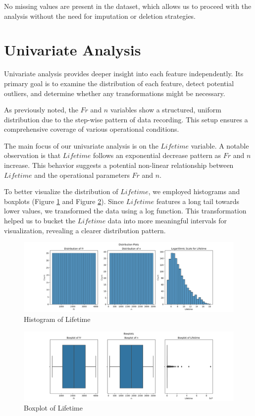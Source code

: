 No missing values are present in the dataset, which allows us to proceed with the analysis without the need for imputation or deletion strategies.


\section{Univariate Analysis}

Univariate analysis provides deeper insight into each feature independently. Its primary goal is to examine the distribution of each feature, detect potential outliers, and determine whether any transformations might be necessary.

As previously noted, the $Fr$ and $n$ variables show a structured, uniform distribution due to the step-wise pattern of data recording. This setup ensures a comprehensive coverage of various operational conditions.

The main focus of our univariate analysis is on the $Lifetime$ variable. A notable observation is that $Lifetime$ follows an exponential decrease pattern as $Fr$ and $n$ increase. This behavior suggests a potential non-linear relationship between $Lifetime$ and the operational parameters $Fr$ and $n$.

To better visualize the distribution of $Lifetime$, we employed histograms and boxplots (Figure \ref{fig:bearings-histogram} and Figure \ref{fig:bearings-boxplot}). Since $Lifetime$ features a long tail towards lower values, we transformed the data using a log function. This transformation helped us to bucket the $Lifetime$ data into more meaningful intervals for visualization, revealing a clearer distribution pattern.

\begin{figure}[ht]
    \centering
    \includegraphics[width=\textwidth]{assets/bearings-eda/histogram.png}
    \caption{Histogram of Lifetime}
    \label{fig:bearings-histogram}
\end{figure}

\begin{figure}[ht]
    \centering
    \includegraphics[width=\textwidth]{assets/bearings-eda/boxplot.png}
    \caption{Boxplot of Lifetime}
    \label{fig:bearings-boxplot}
\end{figure}

